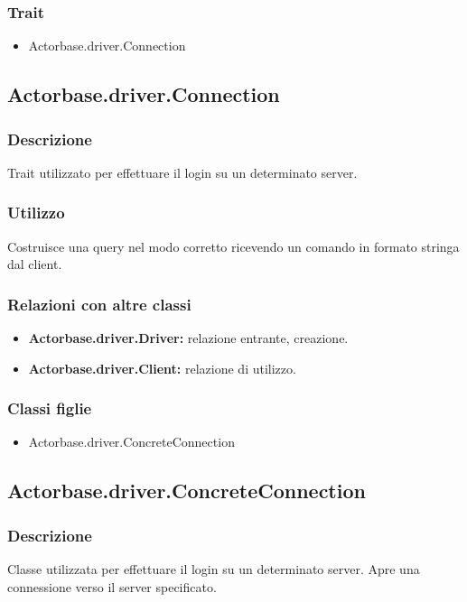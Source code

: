 \documentclass[a4paper]{article}
\begin{document}
			\subsubsection{Trait}
				\begin{itemize}
					\item Actorbase.driver.Connection
				\end{itemize}
					
		\subsection{Actorbase.driver.Connection}
			\subsubsection{Descrizione}
				Trait utilizzato per effettuare il login su un determinato server.
				 
			\subsubsection{Utilizzo}
				Costruisce una query nel modo corretto ricevendo un comando in formato stringa dal client.
				
			\subsubsection{Relazioni con altre classi}
				\begin{itemize}
					\item \textbf{Actorbase.driver.Driver:} relazione entrante, creazione.
					\item \textbf{Actorbase.driver.Client:} relazione di utilizzo.
				\end{itemize}
			\subsubsection{Classi figlie}
				\begin{itemize}
					\item Actorbase.driver.ConcreteConnection
				\end{itemize}
				
		\subsection{Actorbase.driver.ConcreteConnection}
			\subsubsection{Descrizione}
				Classe utilizzata per effettuare il login su un determinato server. Apre una connessione verso il server specificato.
				
\end{document}
